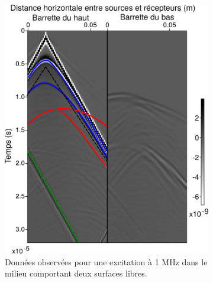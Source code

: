 \documentclass[a4paper,11pt]{report} %
\begin{document}
\begin{figure}[!h]
	\centering
	\begin{subfigure}{0.45\textwidth}
		\includegraphics[width=\textwidth]{img/multi_ref_trans/data_2freesurf.png}
		\caption{Données observées pour une excitation à 1 MHz dans le milieu comportant deux surfaces libres.}
	\end{subfigure}
	\begin{subfigure}{0.45\textwidth}

\end{subfigure}
\end{figure}
\end{document}
